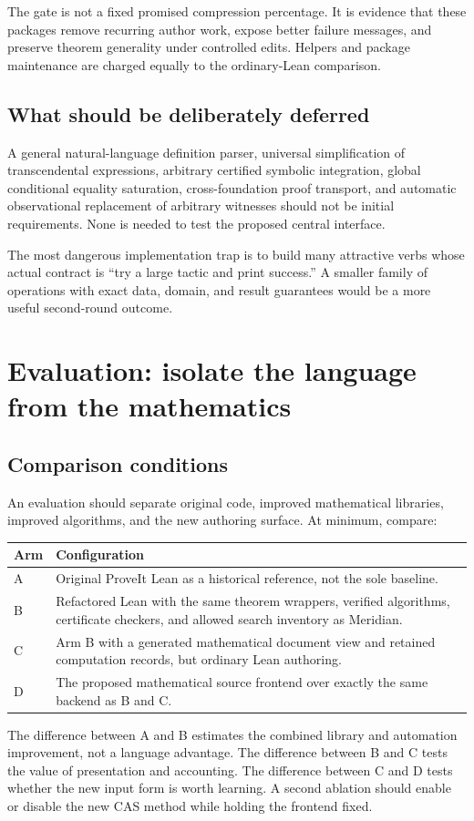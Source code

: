\documentclass[11pt,a4paper]{article}
\theoremstyle{remark}
\begin{document}
The gate is not a fixed promised compression percentage. It is evidence that
these packages remove recurring author work, expose better failure messages,
and preserve theorem generality under controlled edits. Helpers and package
maintenance are charged equally to the ordinary-Lean comparison.

\subsection{What should be deliberately deferred}
A general natural-language definition parser, universal simplification of
transcendental expressions, arbitrary certified symbolic integration, global
conditional equality saturation, cross-foundation proof transport, and automatic
observational replacement of arbitrary witnesses should not be initial
requirements. None is needed to test the proposed central interface.

The most dangerous implementation trap is to build many attractive verbs whose
actual contract is ``try a large tactic and print success.'' A smaller family of
operations with exact data, domain, and result guarantees would be a more useful
second-round outcome.

\section{Evaluation: isolate the language from the mathematics}
\label{sec:evaluation}
\subsection{Comparison conditions}
An evaluation should separate original code, improved mathematical libraries,
improved algorithms, and the new authoring surface. At minimum, compare:
\begin{center}
\begin{tabularx}{\textwidth}{@{}L{.09\textwidth}Y@{}}
\toprule
Arm & Configuration \\
\midrule
A & Original ProveIt Lean as a historical reference, not the sole baseline.\\
B & Refactored Lean with the same theorem wrappers, verified algorithms,
certificate checkers, and allowed search inventory as Meridian.\\
C & Arm B with a generated mathematical document view and retained computation
records, but ordinary Lean authoring.\\
D & The proposed mathematical source frontend over exactly the same backend as
B and C.\\
\bottomrule
\end{tabularx}
\end{center}
The difference between A and B estimates the combined library and automation
improvement, not a language advantage. The difference between B and C tests the
value of presentation and accounting. The difference between C and D tests
whether the new input form is worth learning. A second ablation should enable
or disable the new CAS method while holding the frontend fixed.
\end{document}
